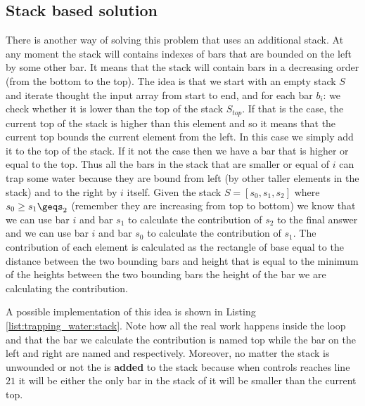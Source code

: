 \subsection{Stack based solution}
\label{trapping_water:sec:stack}
There is another way of solving this problem that uses an additional stack. At any moment the stack will contains indexes of bars that are bounded on the left by some other bar. It means that the stack will contain bars in a decreasing order (from the bottom to the top). The idea is that we start with an empty stack $S$ and iterate thought the input array from start to end, and for each bar $b_i$:
we check whether it is lower than the top of the stack $S_{top}$. If that is the case, the current top of the stack is higher than this element and so it means that the current top bounds the current element from the left. In this case we simply add it to the  top of the stack. If it not the case then we have a bar that is higher or equal to the top. Thus  all the bars in the stack that are smaller or equal of $i$ can trap some water because they are bound from left (by other taller elements in the stack) and to the right by $i$ itself.
Given the stack $S=[s_0, s_1,s_2]$ where $s_0 \geq s_1 \geqs_2$ (remember they are increasing from top to bottom) we know that we can use bar $i$ and bar $s_1$ to calculate the contribution of $s_2$ to the final answer and we can use bar $i$ and bar $s_0$ to calculate the contribution of $s_1$. The contribution of each element is calculated as the rectangle of base equal to the distance between the two bounding bars and height that is equal to the minimum of the heights between the two bounding bars  the height of the bar we are calculating the contribution. 

A possible implementation of this idea is shown in Listing \ref{list:trapping_water:stack}. Note how all the real work happens inside the  loop and that the bar we calculate the contribution is named top while the bar on the left and right are named  and  respectively. Moreover, no matter the stack is unwounded or not the  is \textbf{added} to the stack because when controls reaches line $21$ it will be either the only bar in the stack of it will be smaller than the current top.


